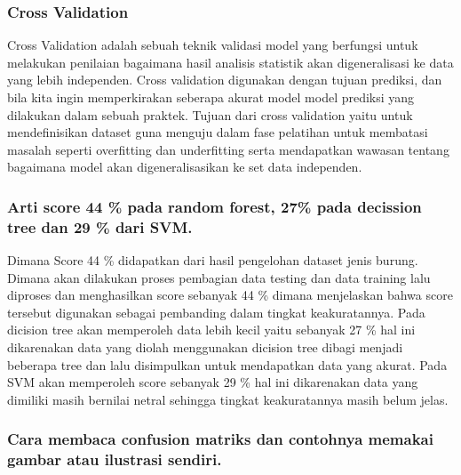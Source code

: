 \subsubsection{Cross Validation}

\hfill\break
Cross Validation adalah sebuah teknik validasi model yang berfungsi untuk melakukan penilaian bagaimana hasil analisis statistik akan digeneralisasi ke data yang lebih independen. Cross validation digunakan dengan tujuan prediksi, dan bila kita ingin memperkirakan seberapa akurat model model prediksi yang dilakukan dalam sebuah praktek. Tujuan dari cross validation yaitu untuk mendefinisikan dataset guna menguju dalam fase pelatihan untuk membatasi masalah seperti overfitting dan underfitting serta mendapatkan wawasan tentang bagaimana model akan digeneralisasikan ke set data independen.

\subsubsection{Arti score 44 \% pada random forest, 27\% pada decission tree dan 29 \% dari SVM.}

\hfill\break
Dimana Score 44 \% didapatkan dari hasil pengelohan dataset jenis burung. Dimana akan dilakukan proses pembagian data testing dan data training lalu diproses dan menghasilkan score sebanyak 44 \% dimana menjelaskan bahwa score tersebut digunakan sebagai pembanding dalam tingkat keakuratannya. Pada dicision tree akan memperoleh data lebih kecil yaitu sebanyak 27 \% hal ini dikarenakan data yang diolah menggunakan dicision tree dibagi menjadi beberapa tree dan lalu disimpulkan untuk mendapatkan data yang akurat. Pada SVM akan memperoleh score sebanyak 29 \% hal ini dikarenakan data yang dimiliki masih bernilai netral sehingga tingkat keakuratannya masih belum jelas.

\subsubsection{Cara membaca confusion matriks dan contohnya memakai gambar atau ilustrasi sendiri.}

